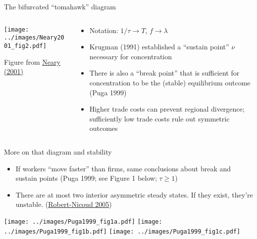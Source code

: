 \documentclass[11pt,notes=hide,aspectratio=169]{beamer}
\begin{document}
\begin{frame}{The bifurcated ``tomahawk'' diagram}
\begin{columns}
\begin{column}{.45\textwidth}
\texttt{[image: ../images/Neary2001\_fig2.pdf]}
\begin{center}
{\footnotesize Figure from \href{https://www.aeaweb.org/articles?id=10.1257/jel.39.2.536}{Neary (2001)}}
\end{center}
\end{column}
\begin{column}{.53\textwidth}
\begin{itemize}
	\item {\small Notation: $1/\tau \to T$, $f \to \lambda$}
	\item Krugman (1991) established a ``sustain point'' $\nu$ necessary for concentration
	\item There is also a ``break point'' that is sufficient for concentration to be the (stable) equilibrium outcome (Puga 1999)
	\item Higher trade costs can prevent regional divergence; sufficiently low trade costs rule out symmetric outcomes
\end{itemize}
\vfill
\end{column}
\end{columns}
\end{frame}
\begin{frame}{More on that diagram and stability}
\begin{itemize}
	\item If workers ``move faster'' than firms, same conclusions about break and sustain points (Puga 1999; see Figure 1 below; $\tau \geq 1$)
	\item There are at most two interior asymmetric steady states. If they exist, they're unstable. (\href{https://ideas.repec.org/a/oup/jecgeo/v5y2005i2p201-234.html}{Robert-Nicoud 2005})
\end{itemize}
\texttt{[image: ../images/Puga1999\_fig1a.pdf]}
\texttt{[image: ../images/Puga1999\_fig1b.pdf]}
\texttt{[image: ../images/Puga1999\_fig1c.pdf]}
\end{frame}
\end{document}
